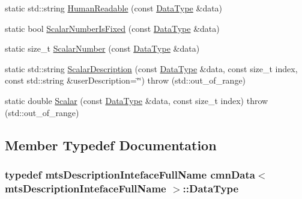 \begin{DoxyCompactItemize}
\item 
static std\+::string \hyperlink{classcmn_data_3_01mts_description_inteface_full_name_01_4_a2838a99cc753656b9302c5186689d936}{Human\+Readable} (const \hyperlink{classcmn_data_3_01mts_description_inteface_full_name_01_4_a7c49303638b183151217d48ca5d2eda8}{Data\+Type} \&data)
\item 
static bool \hyperlink{classcmn_data_3_01mts_description_inteface_full_name_01_4_a308df64feba1f0b487a550b7d343f06d}{Scalar\+Number\+Is\+Fixed} (const \hyperlink{classcmn_data_3_01mts_description_inteface_full_name_01_4_a7c49303638b183151217d48ca5d2eda8}{Data\+Type} \&data)
\item 
static size\+\_\+t \hyperlink{classcmn_data_3_01mts_description_inteface_full_name_01_4_a6ce5997eb60d7ad40a2f189d0bd16b24}{Scalar\+Number} (const \hyperlink{classcmn_data_3_01mts_description_inteface_full_name_01_4_a7c49303638b183151217d48ca5d2eda8}{Data\+Type} \&data)
\item 
static std\+::string \hyperlink{classcmn_data_3_01mts_description_inteface_full_name_01_4_a74d3b7e82196937c94994e6e49c156d5}{Scalar\+Description} (const \hyperlink{classcmn_data_3_01mts_description_inteface_full_name_01_4_a7c49303638b183151217d48ca5d2eda8}{Data\+Type} \&data, const size\+\_\+t index, const std\+::string \&user\+Description=\char`\"{}\char`\"{})  throw (std\+::out\+\_\+of\+\_\+range)
\item 
static double \hyperlink{classcmn_data_3_01mts_description_inteface_full_name_01_4_a23f8910c7b9e69b8586f76c5760c7011}{Scalar} (const \hyperlink{classcmn_data_3_01mts_description_inteface_full_name_01_4_a7c49303638b183151217d48ca5d2eda8}{Data\+Type} \&data, const size\+\_\+t index)  throw (std\+::out\+\_\+of\+\_\+range)
\end{DoxyCompactItemize}


\subsection{Member Typedef Documentation}
\hypertarget{classcmn_data_3_01mts_description_inteface_full_name_01_4_a7c49303638b183151217d48ca5d2eda8}{}
\subsubsection[{Data\+Type}]{\setlength{\rightskip}{0pt plus 5cm}typedef {\bf mts\+Description\+Inteface\+Full\+Name} {\bf cmn\+Data}$<$ {\bf mts\+Description\+Inteface\+Full\+Name} $>$\+::{\bf Data\+Type}}\label{classcmn_data_3_01mts_description_inteface_full_name_01_4_a7c49303638b183151217d48ca5d2eda8}



